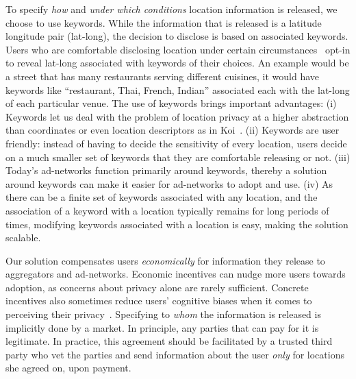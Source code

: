 To specify \emph{how} and \emph{under which conditions} location information is released, we choose to use keywords. 
While the information that is released is a latitude longitude pair (lat-long), the decision to disclose is based on associated keywords. 
Users who are comfortable disclosing location under certain circumstances~\cite{Kelley:2011} opt-in to reveal lat-long associated with keywords of their choices.
%
An example would be a street that has many restaurants serving different cuisines, it would have keywords like ``restaurant, Thai, French, Indian'' associated each with the lat-long of each particular venue. 
The use of keywords brings important advantages: 
(i) Keywords let us deal with the problem of location privacy at a higher abstraction than coordinates or even location descriptors as in Koi~\cite{guha:koi}. 
(ii) Keywords are user friendly: instead of having to decide the sensitivity of every location, users decide on a much smaller set of keywords that they are comfortable releasing or not.
(iii) Today's ad-networks function primarily around keywords, thereby a solution around keywords can make it easier for ad-networks to adopt and use.
(iv) As there can be a finite set of keywords associated with any location, and the association of a keyword with a location typically remains for long periods of times, modifying keywords associated with a location is easy, making the solution scalable. 

Our solution compensates users \emph{economically} for information they release to aggregators and ad-networks. Economic incentives can nudge more users towards adoption, as concerns about privacy alone are rarely sufficient. Concrete incentives also sometimes reduce users' cognitive biases when it comes to perceiving their privacy~\cite{loewenstein2010misplaced}. Specifying to \emph{whom} the information is released is implicitly done by a market. 
In principle, any parties that can pay for it is legitimate. In practice, this agreement should be facilitated by a trusted third party who vet the parties and send information about the user \emph{only} for locations she agreed on, upon payment. 

